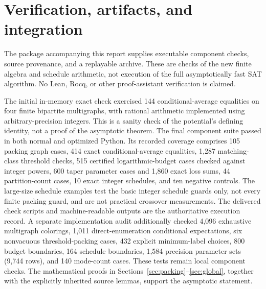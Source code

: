 \documentclass[11pt]{article}
\theoremstyle{remark}\newtheorem{remark}[theorem]{Remark}
\begin{document}
\section{Verification, artifacts, and integration}
\label{sec:validation}
The package accompanying this report supplies executable component checks, source provenance, and a replayable archive. These are checks of the new finite algebra and schedule arithmetic, not execution of the full asymptotically fast SAT algorithm. No Lean, Rocq, or other proof-assistant verification is claimed.

The initial in-memory exact check exercised 144 conditional-average equalities on four finite bipartite multigraphs, with rational arithmetic implemented using arbitrary-precision integers. This is a sanity check of the potential's defining identity, not a proof of the asymptotic theorem. The final component suite passed in both normal and optimized Python. Its recorded coverage comprises 105 packing graph cases, 414 exact conditional-average equalities, 1,287 matching-class threshold checks, 515 certified logarithmic-budget cases checked against integer powers, 600 taper parameter cases and 1,860 exact loss sums, 44 partition-count cases, 10 exact integer schedules, and ten negative controls. The large-size schedule examples test the basic integer schedule guards only, not every finite packing guard, and are not practical crossover measurements. The delivered check scripts and machine-readable outputs are the authoritative execution record. A separate implementation audit additionally checked 4,096 exhaustive multigraph colorings, 1,011 direct-enumeration conditional expectations, six nonvacuous threshold-packing cases, 432 explicit minimum-label choices, 800 budget boundaries, 164 schedule boundaries, 1,584 precision parameter sets (9,744 rows), and 140 mode-count cases. These tests remain local component checks. The mathematical proofs in Sections~\ref{sec:packing}--\ref{sec:global}, together with the explicitly inherited source lemmas, support the asymptotic statement.
\end{document}
